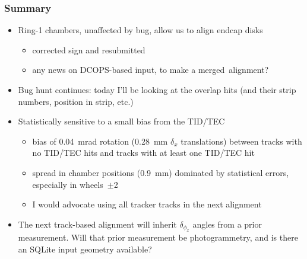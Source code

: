 \documentclass[compress]{beamer}
\begin{document}
\begin{frame}
\frametitle{Summary}
\begin{itemize}\setlength{\itemsep}{0.25 cm}
\item Ring-1 chambers, unaffected by bug, allow us to align endcap disks
\begin{itemize}
\item corrected sign and resubmitted
\item any news on DCOPS-based input, to make a \mbox{merged alignment?\hspace{-1 cm}}
\end{itemize}

\item Bug hunt continues: today I'll be looking at the overlap hits
  (and their strip numbers, position in strip, etc.)

\item Statistically sensitive to a small bias from the TID/TEC
\begin{itemize}
\item bias of 0.04~mrad rotation (0.28~mm $\delta_x$ translations)
  between tracks with no TID/TEC hits and tracks with at least one TID/TEC hit
\item spread in chamber positions (0.9~mm) dominated by statistical
  errors, especially in wheels~$\pm$2
\item I would advocate using all tracker tracks in the next alignment
\end{itemize}

\item The next track-based alignment will inherit $\delta_{\phi_x}$
  angles from a prior measurement.  Will that prior measurement be
  photogrammetry, and is there an SQLite input geometry available?
\end{itemize}

\label{numpages}
\end{frame}
\end{document}
